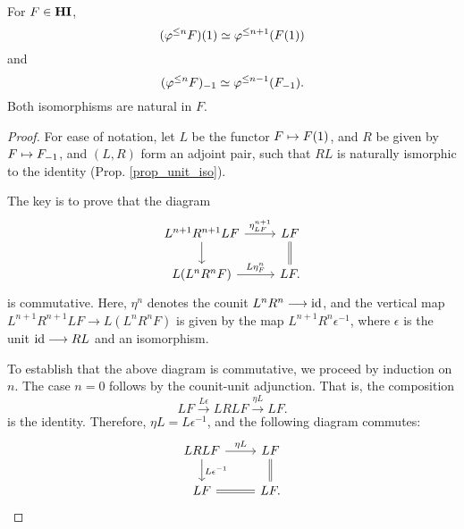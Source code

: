 \begin{prop}\label{prop_tl_L_R}
For $F \in \mathbf{HI}$, 
\[
(\varphi^{\leq n} F)(1) \simeq \varphi^{\leq n + 1}(F(1))
\]
and
\[
(\varphi^{\leq n} F)_{-1} \simeq \varphi^{\leq n - 1}(F_{-1}).
\] 
Both isomorphisms are natural in $F$.
\end{prop}
\begin{proof}
For ease of notation, let $L$ be the functor $F \mapsto F(1)$, 
and $R$ be given by $F \mapsto F_{-1}$, and $(L, R)$ form an 
adjoint pair, such that $RL$ is naturally ismorphic to the 
identity (Prop. \ref{prop_unit_iso}).

The key is to prove that the diagram
\begin{equation}\label{eq_Ltl_com_diag}
\begin{tikzcd}
L^{n + 1}R^{n + 1}LF \arrow{r}{\eta^{n + 1}_{LF}} \arrow{d} &
LF \arrow[equals]{d} \\
L(L^{n}R^nF) \arrow{r}{L\eta^{n}_F} &
LF.
\end{tikzcd}
\end{equation}
is commutative. Here, $\eta^n$ denotes the counit $L^nR^n \longrightarrow \mathrm{id}$,
and the vertical map $L^{n + 1}R^{n + 1}LF \to L(L^nR^n F)$ is 
given by the map $L^{n + 1}R^n \epsilon^{-1}$, where $\epsilon$ is
the unit $\mathrm{id} \longrightarrow RL$ and an isomorphism.

To establish that the above diagram is commutative, we proceed by 
induction on $n$. The case $n = 0$ follows by the counit-unit 
adjunction. That is, the composition
\[
LF \stackrel{L\epsilon}{\to} LRLF \stackrel{\eta L}{\to} LF.
\]
is the identity. Therefore, $\eta L = L\epsilon^{-1}$, and the
following diagram commutes:
\[
\begin{tikzcd}
LRL F \arrow{r}{\eta L} \arrow{d}{L \epsilon^{-1}} &
LF \arrow[equals]{d} \\
LF \arrow[equals]{r} & LF.
\end{tikzcd}
\]


\end{proof}
